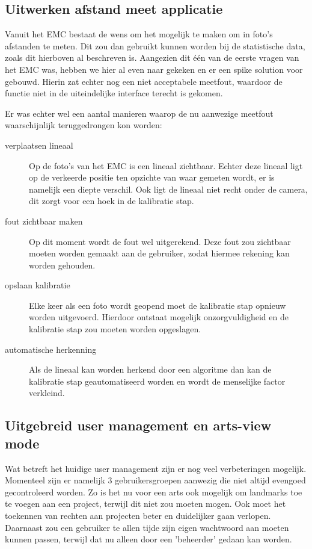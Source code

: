 \subsection{Uitwerken afstand meet applicatie} %
Vanuit het EMC bestaat de wens om het mogelijk te maken om in foto's afstanden te meten.
Dit zou dan gebruikt kunnen worden bij de statistische data, zoals dit hierboven al beschreven is.
Aangezien dit \'{e}\'{e}n van de eerste vragen van het EMC was, hebben we hier al even naar gekeken en er een spike solution voor gebouwd.
Hierin zat echter nog een niet acceptabele meetfout, waardoor de functie niet in de uiteindelijke interface terecht is gekomen.

Er was echter wel een aantal manieren waarop de nu aanwezige meetfout waarschijnlijk teruggedrongen kon worden:
\begin{description}
	\item[verplaatsen lineaal] Op de foto's van het EMC is een lineaal zichtbaar. 
	Echter deze lineaal ligt op de verkeerde positie ten opzichte van waar gemeten wordt, er is namelijk een diepte verschil. 
	Ook ligt de lineaal niet recht onder de camera, dit zorgt voor een hoek in de kalibratie stap.
	\item[fout zichtbaar maken] Op dit moment wordt de fout wel uitgerekend. 
	Deze fout zou zichtbaar moeten worden gemaakt aan de gebruiker, zodat hiermee rekening kan worden gehouden.
	\item[opslaan kalibratie] Elke keer als een foto wordt geopend moet de kalibratie stap opnieuw worden uitgevoerd. 
	Hierdoor ontstaat mogelijk onzorgvuldigheid en de kalibratie stap zou moeten worden opgeslagen.
	\item[automatische herkenning] Als de lineaal kan worden herkend door een algoritme dan kan de kalibratie stap geautomatiseerd worden en wordt de menselijke factor verkleind.
\end{description}

\subsection{Uitgebreid user management en arts-view mode} %
Wat betreft het huidige user management zijn er nog veel verbeteringen mogelijk.
Momenteel zijn er namelijk 3 gebruikersgroepen aanwezig die niet altijd evengoed gecontroleerd worden.
Zo is het nu voor een arts ook mogelijk om landmarks toe te voegen aan een project, terwijl dit niet zou moeten mogen.
Ook moet het toekennen van rechten aan projecten beter en duidelijker gaan verlopen.
Daarnaast zou een gebruiker te allen tijde zijn eigen wachtwoord aan moeten kunnen passen, terwijl dat nu alleen door een 'beheerder' gedaan kan worden.

